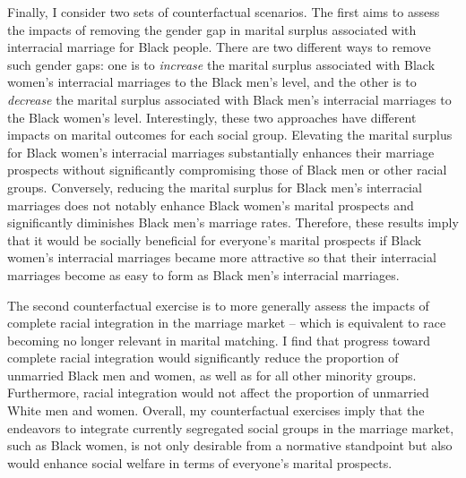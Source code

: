 

Finally, I consider two sets of counterfactual scenarios. The first aims to assess the impacts of removing the gender gap in marital surplus associated with interracial marriage for Black people. There are two different ways to remove such gender gaps: one is to \textit{increase} the marital surplus associated with Black women's interracial marriages to the Black men's level, and the other is to \textit{decrease} the marital surplus associated with Black men's interracial marriages to the Black women's level. Interestingly, these two approaches have different impacts on marital outcomes for each social group. Elevating the marital surplus for Black women's interracial marriages substantially enhances their marriage prospects without significantly compromising those of Black men or other racial groups. Conversely, reducing the marital surplus for Black men's interracial marriages does not notably enhance Black women's marital prospects and significantly diminishes Black men's marriage rates. Therefore, these results imply that it would be socially beneficial for everyone's marital prospects if Black women's interracial marriages became more attractive so that their interracial marriages become as easy to form as Black men's interracial marriages. 



The second counterfactual exercise is to more generally assess the impacts of complete racial integration in the marriage market -- which is equivalent to race becoming no longer relevant in marital matching. I find that progress toward complete racial integration would significantly reduce the proportion of unmarried Black men and women, as well as for all other minority groups. Furthermore, racial integration would not affect the proportion of unmarried White men and women. Overall, my counterfactual exercises imply that the endeavors to integrate currently segregated social groups in the marriage market, such as Black women, is not only desirable from a normative standpoint but also would enhance social welfare in terms of everyone's marital prospects.

